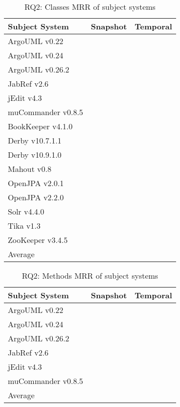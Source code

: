\begin{table}[t]
\renewcommand{\arraystretch}{1.3}
\footnotesize
\centering
\caption{RQ2: Classes MRR of subject systems}
\begin{tabular}{lrr}
    \toprule
    Subject System      & Snapshot  & Temporal \\
    \midrule
    ArgoUML v0.22       &           &           \\
    ArgoUML v0.24       &           &           \\
    ArgoUML v0.26.2     &           &           \\
    JabRef v2.6         &           &           \\
    jEdit v4.3          &           &           \\
    muCommander v0.8.5  &           &           \\
    BookKeeper v4.1.0   &           &           \\
    Derby v10.7.1.1     &           &           \\
    Derby v10.9.1.0     &           &           \\
    Mahout v0.8         &           &           \\
    OpenJPA v2.0.1      &           &           \\
    OpenJPA v2.2.0      &           &           \\
    Solr v4.4.0         &           &           \\
    Tika v1.3           &           &           \\
    ZooKeeper v3.4.5    &           &           \\
    \midrule
    Average             &           &           \\
    \bottomrule
\end{tabular}
\label{table:rq2classes}
\end{table}

\begin{table}[t]
\renewcommand{\arraystretch}{1.3}
\footnotesize
\centering
\caption{RQ2: Methods MRR of subject systems}
\begin{tabular}{lrr}
    \toprule
    Subject System      & Snapshot  & Temporal \\
    \midrule
    ArgoUML v0.22       &           &           \\
    ArgoUML v0.24       &           &           \\
    ArgoUML v0.26.2     &           &           \\
    JabRef v2.6         &           &           \\
    jEdit v4.3          &           &           \\
    muCommander v0.8.5  &           &           \\
    \midrule
    Average             &           &           \\
    \bottomrule
\end{tabular}
\label{table:rq2methods}
\end{table}

